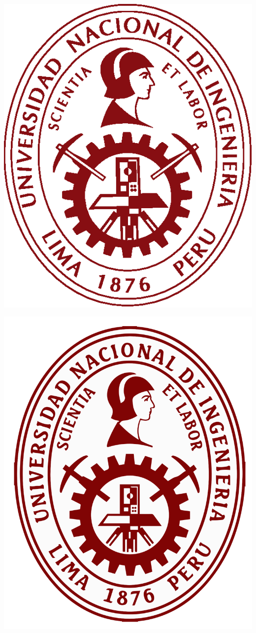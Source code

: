 \documentclass{article}
\begin{document}
\includegraphics[scale=0.3]{logouni}			%

\newpage

\begin{center}
\includegraphics[scale=0.1]{logo}
\end{center}
\end{document}
